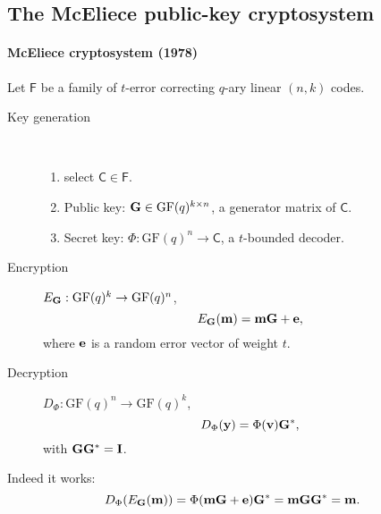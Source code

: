 \documentclass[a4paper, 11pt, openany]{book}
\numberwithin{equation}{section}
\theoremstyle{plain}
\theoremstyle{definition}
\newcommand{\GF}{\mathrm{GF}}
\newcommand{\code}[1]{\mathsf{#1}}
\begin{document}
\subsection{The McEliece public-key cryptosystem}


\paragraph{McEliece cryptosystem (1978)}
Let $\code{F}$ be a family of $t$-error correcting $q$-ary linear $(n,k)$ codes.

\begin{description}
\item[Key generation]~ 
\begin{enumerate}
    \item select $\code{C} \in \code{F}$. 

    \item Public key: ${\bf G} \in \GF(q)^{k \times n}$, a generator matrix of $\code{C}$.
    
    \item Secret key: $\Phi : \GF(q)^n \to \code{C}$, a $t$-bounded decoder.
\end{enumerate}

\item[Encryption] $E_{\bf G} : \GF(q)^k \to \GF(q)^n$,
\[
	E_{\bf G}( {\bf m} ) = {\bf m} {\bf G} + {\bf e},
\]
where ${\bf e}$ is a random error vector of weight $t$.

\item[Decryption] $D_\Phi : \GF(q)^n \to \GF(q)^k$,
\[
	D_\Phi({\bf y}) = \Phi({\bf v}) {\bf G}^*,
\]
with ${\bf G}{\bf G}^* = {\bf I}$.
\end{description}

Indeed it works: 
\[
    D_\Phi( E_{\bf G}( {\bf m} ) ) = \Phi( {\bf m} {\bf G} + {\bf e} ) {\bf G}^* = {\bf m}{\bf G} {\bf G}^* = {\bf m}.
\]
\end{document}
